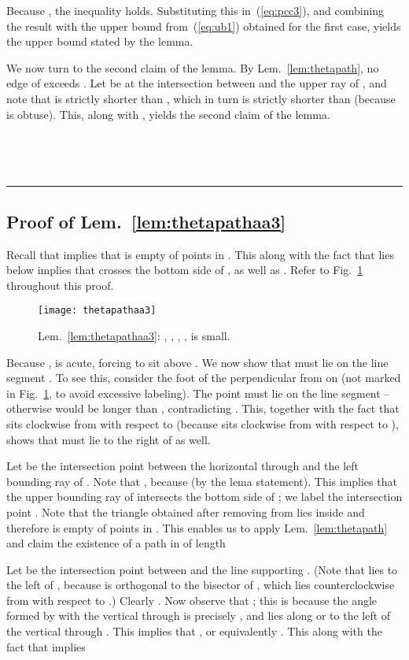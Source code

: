 \documentclass[11pt]{article}
\newcommand{\qed}{\rule{0.5em}{1.5ex}}
\newcommand{\fqed}{{\hfill~\qed}}
\newcommand{\eproof}{{\hfill~\fqed} \vspace{1em}}
\begin{document}
Because , the inequality  holds. Substituting this in~(\ref{eq:pcc3}), and combining the result with the upper bound from~(\ref{eq:ub1}) obtained for the first case,
yields the upper bound stated by the lemma.

We now turn to the second claim of the lemma. By Lem.~\ref{lem:thetapath}, no edge of  exceeds . Let  be at the intersection between  and the upper ray of , and note that
 is strictly shorter than , which in turn is strictly shorter than  (because  is obtuse). This, along with , yields the second claim of the lemma.
\eproof

\subsection{Proof of Lem.~\ref{lem:thetapathaa3}}
Recall that  implies that  is empty of points in . This along with the fact that  lies below  implies that  crosses the bottom side of , as well as . Refer to Fig.~\ref{fig:thetapathaa3} throughout this proof.
\begin{figure}[htpb]
\centering
\texttt{[image: thetapathaa3]}
\caption{Lem.~\ref{lem:thetapathaa3}: , , , ,  is small.}
\label{fig:thetapathaa3}
\end{figure}
Because ,  is acute, forcing  to sit above . We now show that  must lie on the line segment . To see this, consider the foot  of the perpendicular from  on  (not marked in Fig.~\ref{fig:thetapathaa3}, to avoid excessive labeling). The point  must lie on the line segment  --  otherwise  would be longer than , contradicting . This, together with the fact that  sits clockwise from   with respect to  (because  sits clockwise from  with respect to ), shows that  must lie to the right of  as well.

Let  be the intersection point between the horizontal through  and the left bounding ray of . Note that , because  (by the lema statement). This implies that the upper bounding ray of  intersects the bottom side of ; we label the intersection point . Note that the triangle obtained after removing  from  lies inside  and therefore is empty of points in . This enables us to apply
Lem.~\ref{lem:thetapath} and claim the existence of a path  in  of length

Let  be the intersection point between  and the line supporting . (Note that  lies to the left of , because  is orthogonal to the bisector of , which lies counterclockwise from  with respect to .) Clearly . Now observe that ; this is because the angle formed by  with the vertical through  is precisely , and  lies along or to the left of the vertical through . This implies that , or equivalently . This along with the fact that  implies
\end{document}
